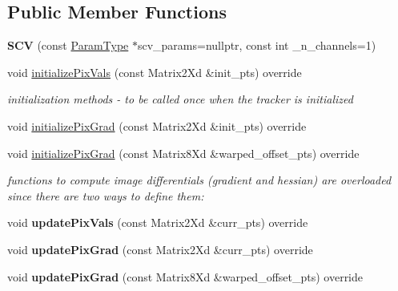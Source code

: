 \subsection*{Public Member Functions}
\begin{DoxyCompactItemize}
\item 
\hypertarget{classSCV_ac279c27c4556bc978db3e80145635fc3}{{\bfseries S\-C\-V} (const \hyperlink{structSCVParams}{Param\-Type} $\ast$scv\-\_\-params=nullptr, const int \-\_\-n\-\_\-channels=1)}\label{classSCV_ac279c27c4556bc978db3e80145635fc3}

\item 
\hypertarget{classSCV_a7b22733ac9613321df318caed6c556a5}{void \hyperlink{classSCV_a7b22733ac9613321df318caed6c556a5}{initialize\-Pix\-Vals} (const Matrix2\-Xd \&init\-\_\-pts) override}\label{classSCV_a7b22733ac9613321df318caed6c556a5}

\begin{DoxyCompactList}\small\item\em initialization methods -\/ to be called once when the tracker is initialized \end{DoxyCompactList}\item 
void \hyperlink{classSCV_acb828cbac2799da234dcefaf48190e7c}{initialize\-Pix\-Grad} (const Matrix2\-Xd \&init\-\_\-pts) override
\item 
void \hyperlink{classSCV_ad72451578ca3a16031924fcd238ae066}{initialize\-Pix\-Grad} (const Matrix8\-Xd \&warped\-\_\-offset\-\_\-pts) override
\begin{DoxyCompactList}\small\item\em functions to compute image differentials (gradient and hessian) are overloaded since there are two ways to define them\-: \end{DoxyCompactList}\item 
\hypertarget{classSCV_a56fe79909d61e0f7f5fdc215385017fe}{void {\bfseries update\-Pix\-Vals} (const Matrix2\-Xd \&curr\-\_\-pts) override}\label{classSCV_a56fe79909d61e0f7f5fdc215385017fe}

\item 
\hypertarget{classSCV_a57be6a18ceb5f61b3a1107bca2bd4715}{void {\bfseries update\-Pix\-Grad} (const Matrix2\-Xd \&curr\-\_\-pts) override}\label{classSCV_a57be6a18ceb5f61b3a1107bca2bd4715}

\item 
\hypertarget{classSCV_aa00dfdbc5788abf28a98ca5d2180f1f5}{void {\bfseries update\-Pix\-Grad} (const Matrix8\-Xd \&warped\-\_\-offset\-\_\-pts) override}\label{classSCV_aa00dfdbc5788abf28a98ca5d2180f1f5}


\end{DoxyCompactItemize}
